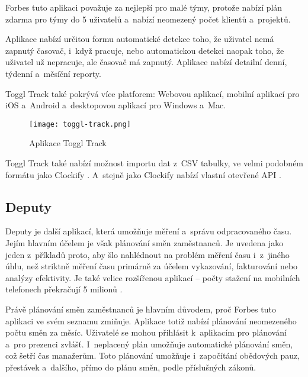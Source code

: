 Forbes tuto aplikaci považuje za nejlepší pro malé týmy, protože nabízí plán zdarma pro týmy do 5 uživatelů a~nabízí neomezený počet klientů a~projektů. \cite{forbes-tracking-apps-article}

Aplikace nabízí určitou formu automatické detekce toho, že uživatel nemá zapnutý časovač, i~když pracuje, nebo automatickou detekci naopak toho, že uživatel už nepracuje, ale časovač má zapnutý. Aplikace nabízí detailní denní, týdenní a~měsíční reporty.

Toggl Track také pokrývá více platforem: Webovou aplikací, mobilní aplikací pro iOS a~Android a~desktopovou aplikací pro Windows a~Mac. \cite{toggl-track}

\begin{figure}[h]
	\centering
	\texttt{[image: toggl-track.png]}
	\caption{Aplikace Toggl Track \cite{toggl-track}}
\end{figure}

Toggl Track také nabízí možnost importu dat z~CSV tabulky, ve velmi podobném formátu jako Clockify \cite{toggl-track-import-csv}. A~stejně jako Clockify nabízí vlastní otevřené API \cite{toggl-track-api}.

\subsection{Deputy}\label{deputy}

Deputy je další aplikací, která umožňuje měření a~správu odpracovaného času. Jejím hlavním účelem je však plánování směn zaměstnanců. Je uvedena jako jeden z~příkladů proto, aby šlo nahlédnout na problém měření času i~z~jiného úhlu, než striktně měření času primárně za účelem vykazování, fakturování nebo analýzy efektivity. Je také velice rozšířenou aplikací – počty stažení na mobilních telefonech překračují 5 milionů \cite{deputy-app-magic}.

Právě plánování směn zaměstnanců je hlavním důvodem, proč Forbes tuto aplikaci ve svém seznamu zmiňuje. Aplikace totiž nabízí plánování neomezeného počtu směn za měsíc. Uživatelé se mohou přihlásit k~aplikacím pro plánování a~pro prezenci zvlášť. I~neplacený plán umožňuje automatické plánování směn, což šetří čas manažerům. Toto plánování umožňuje i~započítání obědových pauz, přestávek a~dalšího, přímo do plánu směn, podle příslušných zákonů.  \cite{forbes-tracking-apps-article}

